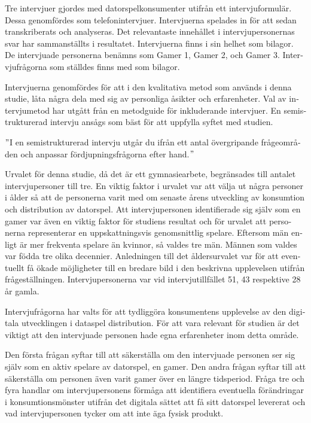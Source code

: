 \documentclass[11p]{article}
\begin{document}
\begin{otherlanguage}{swedish}
    Tre intervjuer gjordes med datorspelkonsumenter utifrån ett intervjuformulär. Dessa genomfördes som telefonintervjuer. Intervjuerna spelades in för att sedan transkriberats och analyseras. Det relevantaste innehållet i intervjupersonernas svar har sammanställts i resultatet.  Intervjuerna finns i sin helhet som bilagor. De intervjuade personerna benämns som Gamer 1, Gamer 2, och Gamer 3.  Intervjufrågorna som ställdes finns med som bilagor.


    Intervjuerna genomfördes för att i den kvalitativa metod som används i denna studie, låta några dela med sig av personliga åsikter och erfarenheter. Val av intervjumetod har utgått från en metodguide för inkluderande intervjuer. En semistrukturerad intervju ansågs som bäst för att uppfylla syftet med studien.

        \("\)I en semistrukturerad intervju utgår du ifrån ett antal övergripande frågeområden och anpassar fördjupningsfrågorna efter hand.\("\) \parencite{Metodguide}

    Urvalet för denna studie, då det är ett gymnasiearbete, begränsades till antalet intervjupersoner till tre.
    En viktig faktor i urvalet var att välja ut några personer i ålder så att de personerna varit med om senaste årens utveckling av konsumtion och distribution av datorspel.
    Att intervjupersonen identifierade sig själv som en gamer var även en viktig faktor för studiens resultat och för urvalet att personerna representerar en uppskattningsvis genomsnittlig spelare.
    Eftersom män enligt \textcite{folkhalsa} är mer frekventa spelare än kvinnor, så valdes tre män.
    Männen som valdes var födda tre olika decennier.
    Anledningen till det åldersurvalet var för att eventuellt få ökade möjligheter till en bredare bild i den beskrivna upplevelsen utifrån frågeställningen.
    Intervjupersonerna var vid intervjutillfället 51, 43 respektive 28 år gamla.

    Intervjufrågorna har valts för att tydliggöra konsumentens upplevelse av den digitala utvecklingen i dataspel distribution.
    För att vara relevant för studien är det viktigt att den intervjuade personen hade egna erfarenheter inom detta område.

    Den första frågan syftar till att säkerställa om den intervjuade personen ser sig själv som en aktiv spelare av datorspel, en gamer.
    Den andra frågan syftar till att säkerställa om personen även varit gamer över en längre tidsperiod.
    Fråga tre och fyra handlar om intervjupersonens förmåga att identifiera eventuella förändringar i konsumtionsmönster utifrån det digitala sättet att få sitt datorspel levererat och vad intervjupersonen tycker om att inte äga fysisk produkt.


\end{otherlanguage}
\end{document}
